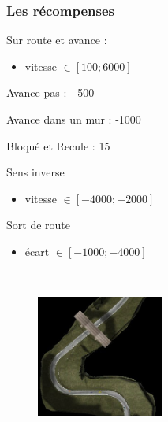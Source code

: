 
\begin{frame}
 \frametitle{Les récompenses}
  
  
  
\begin{minipage}{0.5\textwidth}
 \begin{flushleft}
Sur route et avance : 
\begin{itemize}
 \item vitesse $\in [100;6000]$
\end{itemize}

Avance pas : - 500 

Avance dans un mur : -1000

Bloqué et Recule : 15

Sens inverse
\begin{itemize}
 \item vitesse $\in [-4000;-2000]$
\end{itemize}

Sort de route 
\begin{itemize}
 \item écart $\in [-1000;-4000]$
\end{itemize}

  \end{flushleft}
 \end{minipage}
 ~
 \begin{minipage}{0.4\textwidth}
 \begin{flushright}
  \begin{figure}
      \includegraphics[height=4cm]{images/track.jpg} \\
  \end{figure}
  \end{flushright}
 \end{minipage}
\end{frame}

